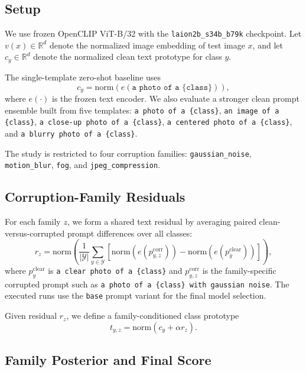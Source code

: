 \documentclass{article}
\newcommand{\vz}{v(x)}
\newcommand{\cy}{c_y}
\newcommand{\rz}{r_z}
\begin{document}
\subsection{Setup}

We use frozen OpenCLIP ViT-B/32 with the \texttt{laion2b\_s34b\_b79k} checkpoint. Let $\vz \in \mathbb{R}^d$ denote the normalized image embedding of test image $x$, and let $\cy \in \mathbb{R}^d$ denote the normalized clean text prototype for class $y$.

The single-template zero-shot baseline uses
\begin{equation}
\cy = \mathrm{norm}\!\left(e(\texttt{a photo of a \{class\}})\right),
\end{equation}
where $e(\cdot)$ is the frozen text encoder. We also evaluate a stronger clean prompt ensemble built from five templates:
\texttt{a photo of a \{class\}},
\texttt{an image of a \{class\}},
\texttt{a close-up photo of a \{class\}},
\texttt{a centered photo of a \{class\}}, and
\texttt{a blurry photo of a \{class\}}.

The study is restricted to four corruption families:
\texttt{gaussian\_noise},
\texttt{motion\_blur},
\texttt{fog}, and
\texttt{jpeg\_compression}.

\subsection{Corruption-Family Residuals}

For each family $z$, we form a shared text residual by averaging paired clean-versus-corrupted prompt differences over all classes:
\begin{equation}
\rz = \mathrm{norm}\!\left(
\frac{1}{|\mathcal{Y}|}
\sum_{y \in \mathcal{Y}}
\left[
\mathrm{norm}\!\left(e(p^{\mathrm{corr}}_{y,z})\right) -
\mathrm{norm}\!\left(e(p^{\mathrm{clear}}_y)\right)
\right]
\right),
\end{equation}
where $p^{\mathrm{clear}}_y$ is \texttt{a clear photo of a \{class\}} and $p^{\mathrm{corr}}_{y,z}$ is the family-specific corrupted prompt such as \texttt{a photo of a \{class\} with gaussian noise}. The executed runs use the \texttt{base} prompt variant for the final model selection.

Given residual $\rz$, we define a family-conditioned class prototype
\begin{equation}
t_{y,z} = \mathrm{norm}(\cy + \alpha \rz).
\end{equation}

\subsection{Family Posterior and Final Score}
\end{document}
